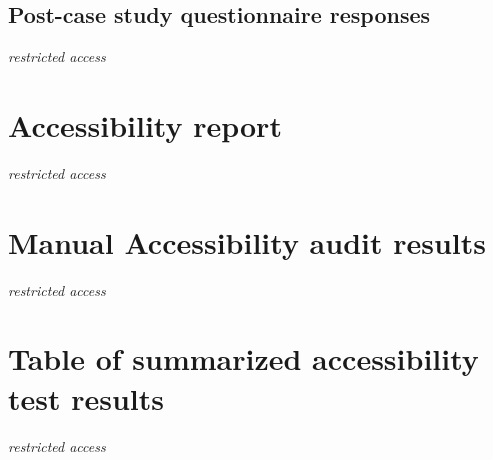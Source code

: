 \documentclass{master_thesis}
\begin{document}
\subsection{Post-case study questionnaire responses}\label{appendix:post-survey-responses}
\textit{restricted access}

\section{Accessibility report}\label{appendix:report}
\textit{restricted access}

\section{Manual Accessibility audit results}\label{appendix:manual-audit}
\textit{restricted access}

\section{Table of summarized accessibility test results}\label{appendix:results-table}
\textit{restricted access}
\end{document}
